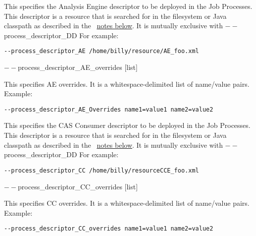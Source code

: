 \begin{description}
           \item[$--$process\_descriptor\_AE {[descriptor]}  ]

             This specifies the Analysis Engine descriptor to be deployed in the Job Processes. This 
             descriptor is a resource that is searched for in the filesystem or Java classpath as described 
             in the ~\hyperref[par:cli.submit.notes]{notes below}.
             It is mutually exclusive with $--$process\_descriptor\_DD For example: 
             \begin{verbatim}
--process_descriptor_AE /home/billy/resource/AE_foo.xml 
             \end{verbatim}


           \begin{sloppypar}
           \item[$--$process\_descriptor\_AE\_overrides {[list]}  ]

             This specifies AE overrides. It is a whitespace-delimited list of name/value pairs. Example: 
             \begin{verbatim}
--process_descriptor_AE_Overrides name1=value1 name2=value2 
             \end{verbatim}
           \end{sloppypar}             

           \item[$--$process\_descriptor\_CC {[descriptor]}  ]

             This specifies the CAS Consumer descriptor to be deployed in the Job Processes. This 
             descriptor is a resource that is searched for in the filesystem or Java classpath as described 
             in the ~\hyperref[par:cli.submit.notes]{notes below}.
             It is mutually exclusive with $--$process\_descriptor\_DD For example: 
             \begin{verbatim}
--process_descriptor_CC /home/billy/resourceCCE_foo.xml 
             \end{verbatim}

           \begin{sloppypar}             
           \item[$--$process\_descriptor\_CC\_overrides {[list]}  ]

             This specifies CC overrides. It is a whitespace-delimited list of name/value pairs. Example: 
             \begin{verbatim}
--process_descriptor_CC_overrides name1=value1 name2=value2 
             \end{verbatim}
           \end{sloppypar}             
           

\end{description}

